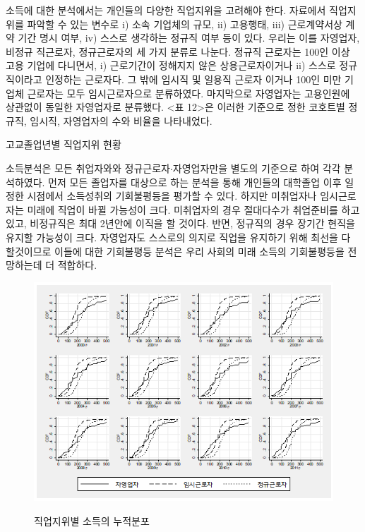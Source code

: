  소득에 대한 분석에서는 개인들의 다양한 직업지위을 고려해야 한다.
 자료에서 직업지위를 파악할 수 있는 변수로 i) 소속 기업체의 규모, ii) 고용행태, iii) 근로계약서상 계약 기간 명시 여부, iv) 스스로 생각하는 정규직 여부 등이 있다.
  우리는 이를 자영업자, 비정규 직근로자, 정규근로자의 세 가지 분류로 나눈다.
  정규직 근로자는 100인 이상 고용 기업에 다니면서, i) 근로기간이 정해지지 않은 상용근로자이거나 ii) 스스로 정규직이라고 인정하는 근로자다.
  그 밖에 임시직 및 일용직 근로자 이거나 100인 미만 기업체 근로자는 모두 임시근로자으로 분류하였다.
  마지막으로 자영업자는 고용인원에 상관없이 동일한 자영업자로 분류했다.
  <표 12>은 이러한 기준으로 정한 코호트별 정규직, 임시직, 자영업자의 수와 비율을 나타내었다.
 
\begin{table}[htbp]
    \centering
    \caption{고교졸업년별 직업지위 현황}
    
    \label{tab:goms_job_byyear}
\end{table}
 
 소득분석은 모든 취업자와와 정규근로자$\cdot$자영업자만을 별도의 기준으로 하여 각각 분석하였다.
 먼저 모든 졸업자를 대상으로 하는 분석을 통해 개인들의 대학졸업 이후 일정한 시점에서 소득성취의 기회불평등을 평가할 수 있다.
  하지만 미취업자나 임시근로자는 미래에 직업이 바뀔 가능성이 크다.
  미취업자의 경우 절대다수가 취업준비를 하고 있고, 비정규직은 최대 2년안에 이직을 할 것이다.
  반면, 정규직의 경우 장기간 현직을 유지할 가능성이 크다.
  자영업자도 스스로의 의지로 직업을 유지하기 위해 최선을 다 할것이므로 이들에 대한 기회불평등 분석은 우리 사회의 미래 소득의 기회불평등을 전망하는데 더 적합하다.
 
\begin{figure}
    \centering
    \caption{직업지위별 소득의 누적분포}
    \includegraphics[width=\textwidth]{figure/goms_cdf_myjob.png}
    \label{fig:goms_cdf_myjob}
\end{figure}

